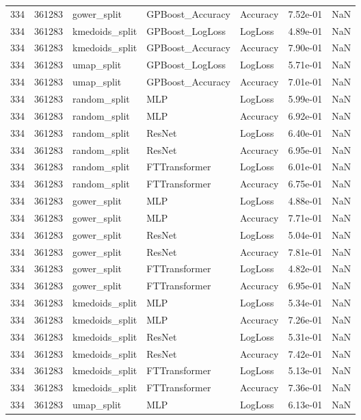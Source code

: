 \begin{tabular}{rrlllrr}
334 & 361283 & gower\_split & GPBoost\_Accuracy & Accuracy & 7.52e-01 & NaN \\
334 & 361283 & kmedoids\_split & GPBoost\_LogLoss & LogLoss & 4.89e-01 & NaN \\
334 & 361283 & kmedoids\_split & GPBoost\_Accuracy & Accuracy & 7.90e-01 & NaN \\
334 & 361283 & umap\_split & GPBoost\_LogLoss & LogLoss & 5.71e-01 & NaN \\
334 & 361283 & umap\_split & GPBoost\_Accuracy & Accuracy & 7.01e-01 & NaN \\
334 & 361283 & random\_split & MLP & LogLoss & 5.99e-01 & NaN \\
334 & 361283 & random\_split & MLP & Accuracy & 6.92e-01 & NaN \\
334 & 361283 & random\_split & ResNet & LogLoss & 6.40e-01 & NaN \\
334 & 361283 & random\_split & ResNet & Accuracy & 6.95e-01 & NaN \\
334 & 361283 & random\_split & FTTransformer & LogLoss & 6.01e-01 & NaN \\
334 & 361283 & random\_split & FTTransformer & Accuracy & 6.75e-01 & NaN \\
334 & 361283 & gower\_split & MLP & LogLoss & 4.88e-01 & NaN \\
334 & 361283 & gower\_split & MLP & Accuracy & 7.71e-01 & NaN \\
334 & 361283 & gower\_split & ResNet & LogLoss & 5.04e-01 & NaN \\
334 & 361283 & gower\_split & ResNet & Accuracy & 7.81e-01 & NaN \\
334 & 361283 & gower\_split & FTTransformer & LogLoss & 4.82e-01 & NaN \\
334 & 361283 & gower\_split & FTTransformer & Accuracy & 6.95e-01 & NaN \\
334 & 361283 & kmedoids\_split & MLP & LogLoss & 5.34e-01 & NaN \\
334 & 361283 & kmedoids\_split & MLP & Accuracy & 7.26e-01 & NaN \\
334 & 361283 & kmedoids\_split & ResNet & LogLoss & 5.31e-01 & NaN \\
334 & 361283 & kmedoids\_split & ResNet & Accuracy & 7.42e-01 & NaN \\
334 & 361283 & kmedoids\_split & FTTransformer & LogLoss & 5.13e-01 & NaN \\
334 & 361283 & kmedoids\_split & FTTransformer & Accuracy & 7.36e-01 & NaN \\
334 & 361283 & umap\_split & MLP & LogLoss & 6.13e-01 & NaN \\

\end{tabular}
